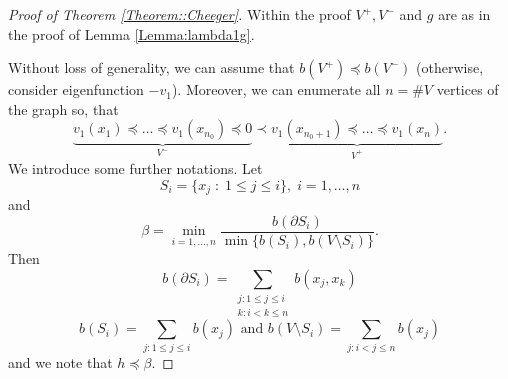 \documentclass[a4paper,12pt]{amsart}
\theoremstyle{definition}
\newcommand{\weight}{b}
\begin{document}
\begin{proof}[Proof of Theorem \ref{Theorem::Cheeger}]
Within the proof $V^+, V^-$ and $g$ are as in the proof of Lemma \ref{Lemma:lambda1g}.

Without loss of generality, we can assume that $\weight (V^+)\preceq \weight (V^-)$ (otherwise, consider eigenfunction $-v_1$). Moreover, we can enumerate all $n=\#V$ vertices of the graph so, that 
\begin{equation*}
\underbrace{v_1(x_1)\preceq\dots \preceq v_1(x_{n_0})\preceq 0}_{V^-}\prec\underbrace{ v_1(x_{n_0+1})\preceq\dots\preceq v_1(x_{n})}_{V^+}.
\end{equation*}
We introduce some further notations. Let
\begin{equation*}
S_i = \{x_j\;:\; 1\le j \le i\},\; i= {1,\dots, n}
\end{equation*}
and
\begin{equation*}
\beta = \min_{i= {1,\dots, n}} \dfrac{\weight(\partial S_i)}{\min\{\weight(S_i), \weight(V\setminus S_i)\}}.
\end{equation*}
Then
\begin{equation*}
\weight(\partial S_i) = \sum_{\substack{j: 1\le j \le i\\k: i<k\le n}}  \weight (x_j,x_k)
\end{equation*}
\begin{equation*}
\weight(S_i) = \sum_{j: 1\le j \le  i}  \weight (x_j)\mbox{ and } \weight(V\setminus S_i) = \sum_{j: i< j \le n}  \weight (x_j)
\end{equation*}
and we note that $h\preceq\beta$.




\end{proof}
\end{document}
